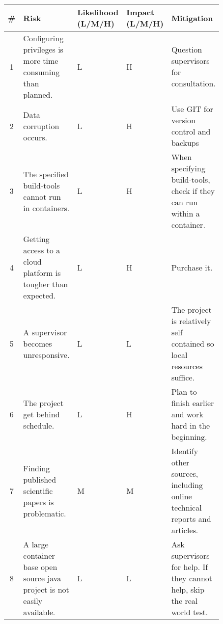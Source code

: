 \begin{table}[]
    \begin{tabular}{c|p{0.35\linewidth}|>{\centering}p{0.085\linewidth}|>{\centering}p{0.085\linewidth}|p{0.35\linewidth}}
    \textbf{\#} & \textbf{Risk}                               & \textbf{Likelihood \\ (L/M/H)} & \textbf{Impact\\(L/M/H)} & \textbf{Mitigation}                                         \\
    \hline
    1           & Configuring privileges is more time consuming than planned.     & L                           & H                       & Question supervisors for consultation.                                          \\ 
    \hline
    2           & Data corruption occurs.                                         & L                           & H                       & Use GIT for version control and backups                                         \\
    \hline
    3           & The specified build-tools cannot run in containers.             & L                           & H                       & When specifying build-tools, check if they can run within a container.          \\
    \hline
    4           & Getting access to a cloud platform is tougher than expected.    & L                           & H                       & Purchase it.                                                                    \\
    \hline
    5           & A supervisor becomes unresponsive.                              & L                           & L                       & The project is relatively self contained so local resources suffice.            \\
    \hline
    6           & The project get behind schedule.                                & L                           & H                       & Plan to finish earlier and work hard in the beginning.                          \\
    \hline
    7           & Finding published scientific papers is problematic.             & M                           & M                       & Identify other sources, including online technical reports and articles.        \\
    \hline
    8           & A large container base open source java project is not easily available. & L                  & L                       & Ask supervisors for help. If they cannot help, skip the real world test. \\

\end{tabular}
\end{table}
